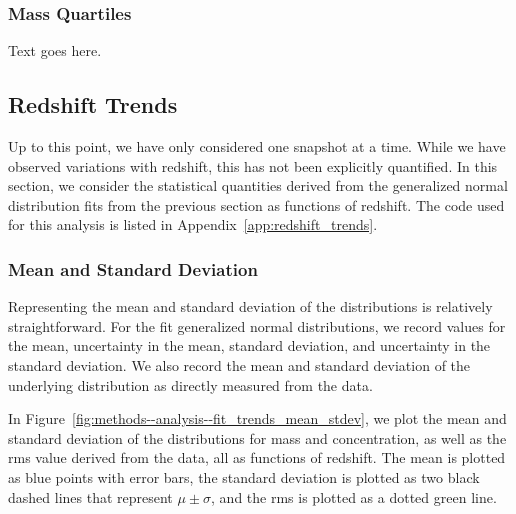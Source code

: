 \subsubsection{Mass Quartiles}
\label{subsubsec:analysis--difference_histograms--mass_quartiles}


Text goes here.




\subsection{Redshift Trends}
\label{subsec:analysis--redshift_trends}


Up to this point, we have only considered one snapshot at a time.  While we have observed variations with redshift, this has not been explicitly quantified.  In this section, we consider the statistical quantities derived from the generalized normal distribution fits from the previous section as functions of redshift.  The code used for this analysis is listed in Appendix~\ref{app:redshift_trends}.



\subsubsection{Mean and Standard Deviation}
\label{subsubsec:analysis--redshift_trends--mean_stdev}


Representing the mean and standard deviation of the distributions is relatively straightforward.  For the fit generalized normal distributions, we record values for the mean, uncertainty in the mean, standard deviation, and uncertainty in the standard deviation.  We also record the mean and standard deviation of the underlying distribution as directly measured from the data.

In Figure~\ref{fig:methods--analysis--fit_trends_mean_stdev}, we plot the mean and standard deviation of the distributions for mass and concentration, as well as the rms value derived from the data, all as functions of redshift.  The mean is plotted as blue points with error bars, the standard deviation is plotted as two black dashed lines that represent $\mu \pm \sigma$, and the rms is plotted as a dotted green line.


